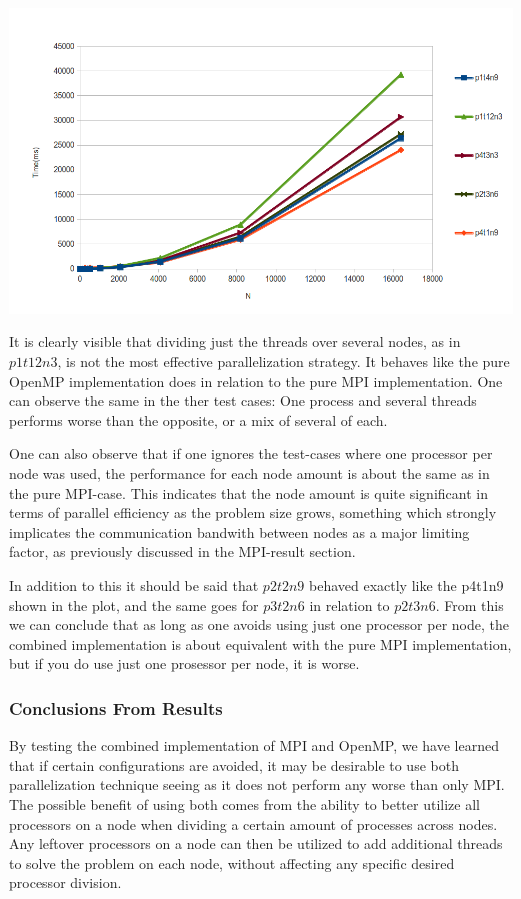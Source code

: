 \documentclass[fontsize=11pt,paper=a4,titlepage]{article}
\begin{document}
\hspace*{-2.3cm}\includegraphics[scale=0.73]{pics/plot.png}

It is clearly visible that dividing just the threads over several nodes, as in $p1t12n3$, is not the most effective parallelization strategy. It behaves like the pure OpenMP implementation does in relation to the pure MPI implementation. One can observe the same in the ther test cases: One process and several threads performs worse than the opposite, or a mix of several of each.

One can also observe that if one ignores the test-cases where one processor per node was used, the performance for each node amount is about the same as in the pure MPI-case. This indicates that the node amount is quite significant in terms of parallel efficiency as the problem size grows, something which strongly implicates the communication bandwith between nodes as a major limiting factor, as previously discussed in the MPI-result section.

In addition to this it should be said that $p2t2n9$ behaved exactly like the p4t1n9 shown in the plot, and the same goes for $p3t2n6$ in relation to $p2t3n6$. From this we can conclude that as long as one avoids using just one processor per node, the combined implementation is about equivalent with the pure MPI implementation, but if you do use just one prosessor per node, it is worse.

\subsubsection{Conclusions From Results}
By testing the combined implementation of MPI and OpenMP, we have learned that if certain configurations are avoided, it may be desirable to use both parallelization technique seeing as it does not perform any worse than only MPI. The possible benefit of using both comes from the ability to better utilize all processors on a node when dividing a certain amount of processes across nodes. Any leftover processors on a node can then be utilized to add additional threads to solve the problem on each node, without affecting any specific desired processor division.
\end{document}

